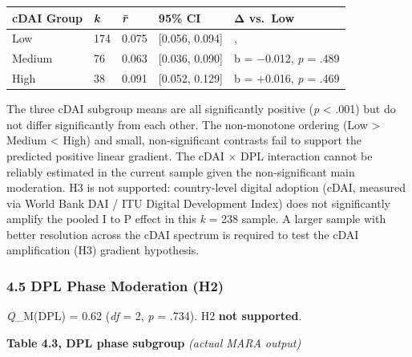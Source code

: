 \documentclass[
  12pt,a4paper]{article}
\begin{document}
\begin{longtable}[]{@{}lllll@{}}
\toprule\noalign{}
cDAI Group & \emph{k} & \emph{r̄} & 95\% CI & Δ vs.~Low \\
\midrule\noalign{}
\endhead
\bottomrule\noalign{}
\endlastfoot
Low & 174 & 0.075 & {[}0.056, 0.094{]} & , \\
Medium & 76 & 0.063 & {[}0.036, 0.090{]} & b = −0.012, \emph{p} =
.489 \\
High & 38 & 0.091 & {[}0.052, 0.129{]} & b = +0.016, \emph{p} = .469 \\
\end{longtable}

The three cDAI subgroup means are all significantly positive (\emph{p}
\textless{} .001) but do not differ significantly from each other. The
non-monotone ordering (Low \textgreater{} Medium \textless{} High) and
small, non-significant contrasts fail to support the predicted positive
linear gradient. The cDAI × DPL interaction cannot be reliably estimated
in the current sample given the non-significant main moderation. H3 is
not supported: country-level digital adoption (cDAI, measured via World
Bank DAI / ITU Digital Development Index) does not significantly amplify
the pooled I to P effect in this \emph{k} = 238 sample. A larger sample
with better resolution across the cDAI spectrum is required to test the
cDAI amplification (H3) gradient hypothesis.

\hypertarget{dpl-phase-moderation-h2}{%
\subsubsection{4.5 DPL Phase Moderation
(H2)}\label{dpl-phase-moderation-h2}}

\emph{Q}\_M(DPL) = 0.62 (\emph{df} = 2, \emph{p} = .734). H2 \textbf{not
supported}.

\textbf{Table 4.3, DPL phase subgroup} \emph{(actual MARA output)}
\end{document}
